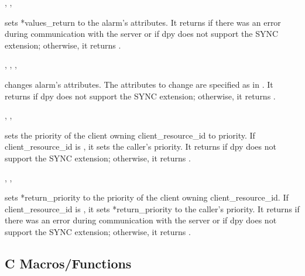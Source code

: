 ,
,
\cendfunctiondecl

 sets *values\_return to the alarm's
attributes.  It returns  if there was an error 
during communication with the server or if dpy does not support 
the SYNC extension; otherwise, it returns .
\cendfuncdescription


,
,
,
\cendfunctiondecl

 changes alarm's attributes.
The attributes to change are specified as in .
It returns  if dpy does not support the SYNC extension; 
otherwise, it returns .
\cendfuncdescription


,
,
\cendfunctiondecl

 sets the priority of the client owning 
client\_resource\_id to priority.  
If client\_resource\_id is ,
it sets the caller's priority.  It returns  if dpy
does not support the SYNC extension; otherwise, it returns .
\cendfuncdescription


,
,
\cendfunctiondecl

 sets *return\_priority to the priority
of the client owning client\_resource\_id. 
If client\_resource\_id is
, it sets *return\_priority to the caller's priority.
It returns  if there was an error
during communication with the server or if dpy does not
support the SYNC extension; otherwise, it returns .
\cendfuncdescription

\subsection{C Macros/Functions}

